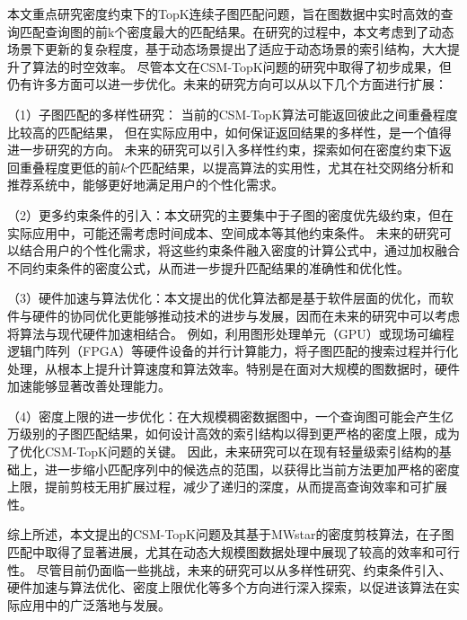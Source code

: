\begin{summary}
	本文重点研究密度约束下的TopK连续子图匹配问题，旨在图数据中实时高效的查询匹配查询图的前k个密度最大的匹配结果。在研究的过程中，本文考虑到了动态场景下更新的复杂程度，基于动态场景提出了适应于动态场景的索引结构，大大提升了算法的时空效率。
	尽管本文在CSM-TopK问题的研究中取得了初步成果，但仍有许多方面可以进一步优化。未来的研究方向可以从以下几个方面进行扩展：

		（1）子图匹配的多样性研究：
		当前的CSM-TopK算法可能返回彼此之间重叠程度比较高的匹配结果，
		但在实际应用中，如何保证返回结果的多样性，是一个值得进一步研究的方向。
		未来的研究可以引入多样性约束，探索如何在密度约束下返回重叠程度更低的前$k$个匹配结果，以提高算法的实用性，尤其在社交网络分析和推荐系统中，能够更好地满足用户的个性化需求。

		（2）更多约束条件的引入：本文研究的主要集中于子图的密度优先级约束，但在实际应用中，可能还需考虑时间成本、空间成本等其他约束条件。
		未来的研究可以结合用户的个性化需求，将这些约束条件融入密度的计算公式中，通过加权融合不同约束条件的密度公式，从而进一步提升匹配结果的准确性和优化性。

		（3）硬件加速与算法优化：本文提出的优化算法都是基于软件层面的优化，而软件与硬件的协同优化更能够推动技术的进步与发展，因而在未来的研究中可以考虑将算法与现代硬件加速相结合。
		例如，利用图形处理单元（GPU）或现场可编程逻辑门阵列（FPGA）等硬件设备的并行计算能力，将子图匹配的搜索过程并行化处理，从根本上提升计算速度和算法效率。特别是在面对大规模的图数据时，硬件加速能够显著改善处理能力。

		（4）密度上限的进一步优化：在大规模稠密数据图中，一个查询图可能会产生亿万级别的子图匹配结果，如何设计高效的索引结构以得到更严格的密度上限，成为了优化CSM-TopK问题的关键。
		因此，未来研究可以在现有轻量级索引结构的基础上，进一步缩小匹配序列中的候选点的范围，以获得比当前方法更加严格的密度上限，提前剪枝无用扩展过程，减少了递归的深度，从而提高查询效率和可扩展性。

	综上所述，本文提出的CSM-TopK问题及其基于MWstar的密度剪枝算法，在子图匹配中取得了显著进展，尤其在动态大规模图数据处理中展现了较高的效率和可行性。
	尽管目前仍面临一些挑战，未来的研究可以从多样性研究、约束条件引入、硬件加速与算法优化、密度上限优化等多个方向进行深入探索，以促进该算法在实际应用中的广泛落地与发展。
\end{summary}
